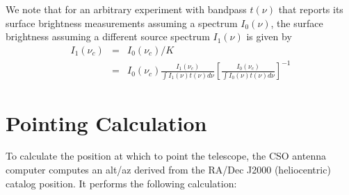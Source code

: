 \documentclass[12pt,preprint]{aastex}
\begin{document}
%
We note that for an arbitrary experiment with bandpass $t(\nu)$ that
reports its surface brightness measurements assuming a spectrum
$I_0(\nu)$, the surface brightness assuming a different source
spectrum $I_1(\nu)$ is given by
\begin{eqnarray}
I_1(\nu_c) &=& I_0(\nu_c) / K \\
\nonumber &=& I_0(\nu_c) \frac{I_1(\nu_c)}{\int I_1(\nu) t(\nu) d \nu} \left[\frac{I_0(\nu_c)}{\int I_0(\nu) t(\nu) d \nu} \right]^{-1}
\end{eqnarray}

\section{Pointing Calculation}
\label{app:PointingCalculation}

To calculate the position at which to point the telescope, the CSO
antenna computer computes an alt/az derived from the RA/Dec J2000
(heliocentric) catalog position.  It performs the following
calculation:
\end{document}
